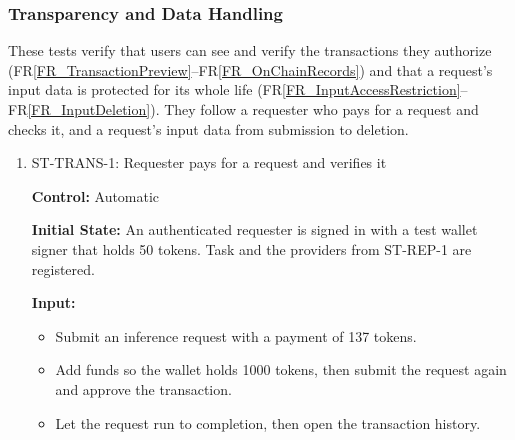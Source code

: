 \documentclass[12pt]{article}
\newcommand{\rref}[1]{FR\ref{#1}}
\newcommand{\fixture}[1]{\texttt{\seqsplit{#1}}}
\begin{document}
\subsubsection{Transparency and Data Handling}

These tests verify that users can see and verify the transactions they
authorize (\rref{FR_TransactionPreview}--\rref{FR_OnChainRecords}) and that a request's input data is protected for its
whole life (\rref{FR_InputAccessRestriction}--\rref{FR_InputDeletion}). They follow a requester who pays for a request and
checks it, and a request's input data from submission to deletion.

\begin{enumerate}

\item{ST-TRANS-1: Requester pays for a request and verifies it\\}

\textbf{Control:} Automatic

\textbf{Initial State:} An authenticated requester is signed in with a test wallet
signer that holds 50 tokens. Task \fixture{Rep-Test-Task} and the providers from
ST-REP-1 are registered.

\textbf{Input:}
\begin{itemize}
\item[1.] Submit an inference request with a payment of 137 tokens.
\item[2.] Add funds so the wallet holds 1000 tokens, then submit the request again
and approve the transaction.
\item[3.] Let the request run to completion, then open the transaction history.
\end{itemize}


\end{enumerate}
\end{document}
